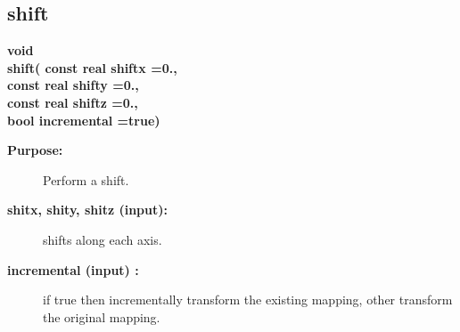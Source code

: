 \subsection{shift}
 
\begin{flushleft} \textbf{%
void  \\ 
\settowidth{\MatrixTransformIncludeArgIndent}{shift(}%
shift( const real shiftx  =0., \\ 
\hspace{\MatrixTransformIncludeArgIndent}const real shifty  =0.,\\ 
\hspace{\MatrixTransformIncludeArgIndent}const real shiftz  =0., \\ 
\hspace{\MatrixTransformIncludeArgIndent}bool incremental   =true)
}\end{flushleft}
\begin{description}
\item[{\bf Purpose:}]  Perform a shift.
\item[{\bf shitx, shity, shitz (input):}]  shifts along each axis.
\item[{\bf incremental (input) :}]  if true then incrementally transform the 
       existing mapping, other transform the original mapping.
\end{description}
